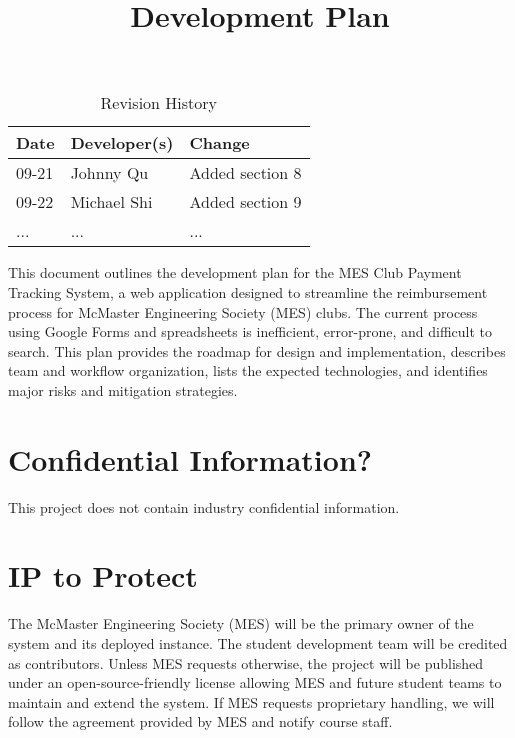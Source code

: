 \documentclass{article}
\title{Development Plan\\\progname}
\author{\authname}
\date{}
\begin{document}
\maketitle

\begin{table}[hp]
\caption{Revision History} \label{TblRevisionHistory}
\begin{tabularx}{\textwidth}{llX}
\toprule
\textbf{Date} & \textbf{Developer(s)} & \textbf{Change}\\
\midrule
09-21 & Johnny Qu & Added section 8\\
09-22 & Michael Shi & Added section 9\\
... & ... & ...\\
\bottomrule
\end{tabularx}
\end{table}

\newpage{}

This document outlines the development plan for the MES Club Payment Tracking System, a web application designed to streamline the reimbursement process for McMaster Engineering Society (MES) clubs. The current process using Google Forms and spreadsheets is inefficient, error-prone, and difficult to search. This plan provides the roadmap for design and implementation, describes team and workflow organization, lists the expected technologies, and identifies major risks and mitigation strategies.


\section{Confidential Information?}

This project does not contain industry confidential information.

\section{IP to Protect}

The McMaster Engineering Society (MES) will be the primary owner of the system and its deployed instance. The student development team will be credited as contributors. Unless MES requests otherwise, the project will be published under an open-source-friendly license allowing MES and future student teams to maintain and extend the system. If MES requests proprietary handling, we will follow the agreement provided by MES and notify course staff.
\end{document}
